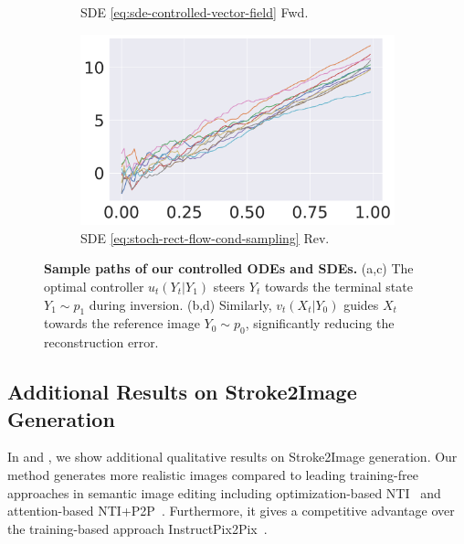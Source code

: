 \documentclass{article} %
\theoremstyle{plain}
\begin{document}
\begin{figure}[!tbh]
\begin{subfigure}[b]{0.24\columnwidth}
        \caption{SDE \eqref{eq:sde-controlled-vector-field} Fwd.}
     \end{subfigure}
     \begin{subfigure}[b]{0.24\columnwidth}
         \centering
         \includegraphics[width=\linewidth]{pics/crf-sde-inv.pdf}
        \caption{SDE \eqref{eq:stoch-rect-flow-cond-sampling} Rev.}
     \end{subfigure}
     \vspace{-0.2cm}
     \caption{
     \textbf{Sample paths of our controlled ODEs and SDEs.} 
     (a,c) The optimal controller $u_t(Y_t|Y_1)$ steers $Y_t$ towards the terminal state $Y_1\sim p_1$ during inversion.
     (b,d) Similarly, $v_t(X_t|Y_0)$ guides $X_t$ towards the reference image $Y_0 \sim p_0$, significantly reducing the reconstruction error. 
     }
    \label{fig:comp-crf-ode-sde}
\end{figure}




\subsection{Additional Results on Stroke2Image Generation}
\label{sec:addn-exp-results}
In  and , we show additional qualitative results on Stroke2Image generation.
Our method generates more realistic images compared to leading training-free approaches in semantic image editing including optimization-based NTI~\citep{nti} and attention-based NTI+P2P~\citep{p2p}.
Furthermore, it gives a competitive advantage over the training-based approach InstructPix2Pix~\citep{instructpix2pix}.
\end{document}
